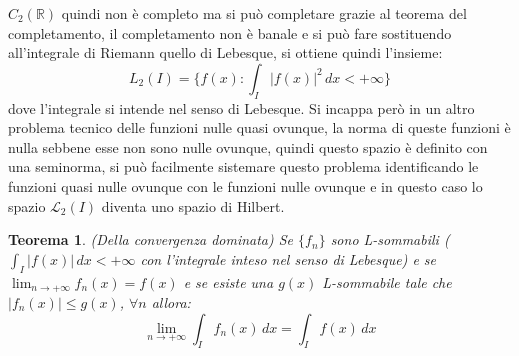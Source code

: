 \documentclass[12pt]{book}
\theoremstyle{plain}
\newcommand{\R}{\mathbb{R}}
\newtheorem{thm}{Teorema}[section]
\theoremstyle{definition}
\theoremstyle{remark}
\begin{document}
$C_2(\R)$ quindi non è completo ma si può completare grazie al teorema del completamento, il completamento non è banale e si può fare sostituendo all'integrale di Riemann quello di Lebesque, si ottiene quindi l'insieme:
\[L_2(I) = \{f(x):\int_I|f(x)|^2\,dx<+\infty\} \]
dove l'integrale si intende nel senso di Lebesque. Si incappa però in un altro problema tecnico delle funzioni nulle quasi ovunque, la norma di queste funzioni è nulla sebbene esse non sono nulle ovunque, quindi questo spazio è definito con una seminorma, si può facilmente sistemare questo problema identificando le funzioni quasi nulle ovunque con le funzioni nulle ovunque e in questo caso lo spazio $\mathcal{L}_2(I)$ diventa uno spazio di Hilbert.
\begin{thm}(Della convergenza dominata)
Se $\{f_n\}$ sono L-sommabili ($\int_I|f(x)|\,dx<+\infty$ con l'integrale inteso nel senso di Lebesque) e se $\displaystyle\lim_{n\to+\infty} f_n(x) = f(x)$ e se esiste una $g(x)$ L-sommabile tale che $|f_n(x)|\leq g(x)$, $\forall n$ allora:
\[\lim_{n\to+\infty} \int_I f_n(x)\,dx = \int_I f(x)\,dx\]
\end{thm}
\end{document}
